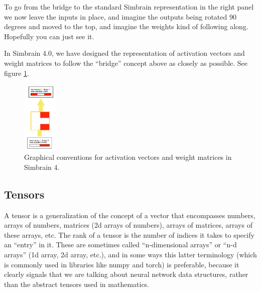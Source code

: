 To go from the bridge to the standard Simbrain representation in the right panel we now leave the inputs in place, and imagine the outputs being rotated 90 degrees and moved to the top, and imagine the weights kind of following along. Hopefully you can just see it. 

In Simbrain 4.0, we have designed the representation of activation vectors and weight matrices to follow the ``bridge'' concept above as closely as possible.  See figure \ref{simbrain4_ff23}.

\begin{figure}[h]
\centering
\includegraphics[width=0.15\textwidth]{images/simbrain4_ff_2_3.png}
\caption[Jeff Yoshimi.]{Graphical conventions for activation vectors and weight matrices in Simbrain 4. }
\label{simbrain4_ff23}
\end{figure}
%
%
%

\subsection{Tensors}

A tensor is a generalization of the concept of a vector that encompasses numbers, arrays of numbers, matrices (2d arrays of numbers), arrays of matrices, arrays of these arrays, etc. The rank of a  tensor is the number of indices it takes to specify an ``entry'' in it. These are sometimes called ``n-dimensional arrays'' or ``n-d arrays'' (1d array, 2d array, etc.), and in some ways this latter terminology (which is commonly used in libraries like numpy and torch) is preferable, because it clearly signals that we are talking about neural network data structures, rather than the abstract tensors used in mathematics. 

